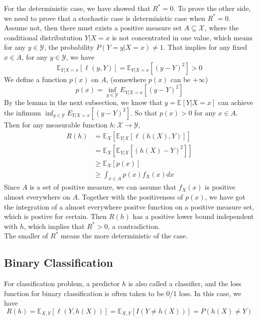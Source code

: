 \noindent For the deterministic case, we have showed that $R^*=0$. To prove the other side, we need to prove that a stochastic case is deterministic case when $R^*=0$. Assume not, then there must exists a positive measure set $A\subseteq \mathcal{X}$, where the conditional distributution $Y|X=x$ is not concentrated in one value, which means for any $y\in \mathcal{Y}$, the probability $P(Y=y|X=x)\ne 1$.
That implies for any fixed $x\in A$, for any $y\in \mathcal{Y}$, we have
\begin{equation}
\mathbb{E}_{Y|X=x}[\ell(y,Y)]= \mathbb{E}_{Y|X=x}[(y-Y)^2]> 0
\end{equation}
We define a function $p(x)$ on $A$, (somewhere $p(x)$ can be $+\infty$)
\begin{equation}
p(x)= \inf_{y\in \mathcal{Y}} {E}_{Y|X=x}[(y-Y)^2]
\end{equation}
By the lemma in the next subsection, we know that $y=\mathbb{E}[Y|X=x]$ can achieve the infimum $\inf_{y\in \mathcal{Y}} {E}_{Y|X=x}[(y-Y)^2]$. So that $p(x)>0$ for any $x\in A$. 
Then for any measurable function $h: \mathcal{X} \to \mathcal{Y}$,
\begin{align}
R(h)&= \mathbb{E}_{X} \left[ \mathbb{E}_{Y|X}[\ell(h(X),Y)] \right]\\
&= \mathbb{E}_{X}[\mathbb{E}_{Y|X}[(h(X)-Y)^2]]\\
&\geq \mathbb{E}_{X}[p(x)]\\
&\geq \int_{x\in A} p(x) f_{X}(x) dx
\end{align}
Since $A$ is a set of positive measure, we can assume that $f_{X}(x)$ is positive almost everywhere on $A$. Together with the positiveness of $p(x)$, we have got the integration of a almost everywhere positve function on a positive measure set, which is postive for certain. Then $R(h)$ has a positive lower bound independent with $h$, which implies that $R^*>0$, a contradiction.\\
The smaller of $R^*$ means the more deterministic of the case.

\subsection{Binary Classification}
For classification problem, a predictor $h$ is also called a classifier, and the loss function for binary classification is often taken to be 0/1 loss. In this case, we have
\begin{equation}
R(h)=\mathbb{\mathbb{E}}_{X,Y}[\ell(Y,h(X))]=\mathbb{\mathbb{E}}_{X,Y}[I(Y\ne h(X))]=P(h(X)\ne Y)
\end{equation}

